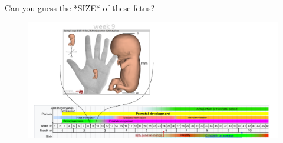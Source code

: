 {
\begin{frame}{Can you guess the *SIZE* of these fetus?}
      \begin{figure}
        \centering
        \includegraphics[width=1.0\textwidth]{./figures/fetal-size/versions/drawing-v02.png}
      \end{figure}
\end{frame}
}


